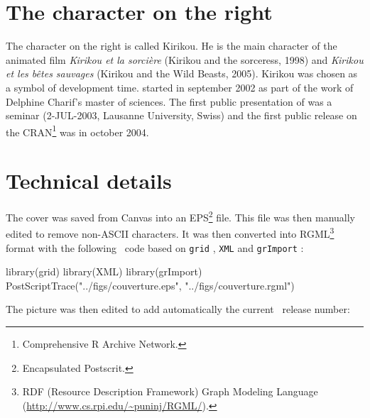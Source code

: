\documentclass[a4paper]{article}
\begin{document}
\section*{The character on the right}

The character on the right is called Kirikou. He is the main character of the animated film \textit{Kirikou et la sorci{\`e}re}
(Kirikou and the sorceress, 1998) and \textit{Kirikou et les b{\^e}tes sauvages}
(Kirikou and the Wild Beasts, 2005). Kirikou was chosen as a symbol of \seqinr{}
development time. \Seqinr{} started in september 2002 as part of the work of
Delphine Charif's master of sciences. The first public presentation of \seqinr{}
was a seminar (2-JUL-2003, Lausanne University, Swiss) and the first public
release on the CRAN\footnote{
Comprehensive R Archive Network.
} was in october 2004.

\section*{Technical details}

The cover was saved from Canvas into an EPS\footnote{
Encapsulated Postscrit.
} file. This file was then manually 
edited to remove non-ASCII characters. It was then converted into RGML\footnote{
RDF (Resource Description Framework) Graph Modeling Language (\url{http://www.cs.rpi.edu/~puninj/RGML/}).
} format
with the following \Rlogo{}~code based on \texttt{grid} \cite{grid},
\texttt{XML} \cite{XML} and \texttt{grImport} \cite{grImport}:
 
\begin{Schunk}
\begin{Sinput}
 library(grid)
 library(XML)
 library(grImport)
 PostScriptTrace("../figs/couverture.eps", "../figs/couverture.rgml")
\end{Sinput}
\end{Schunk}

The picture was then edited to add automatically 
the current \seqinr{}~release number:


\begin{Schunk}
\end{Schunk}
\end{document}
